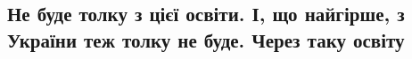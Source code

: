  
 
 
 
 

\subsection{Не буде толку з цієї освіти. І, що найгірше, з України теж толку не буде. Через таку освіту}

